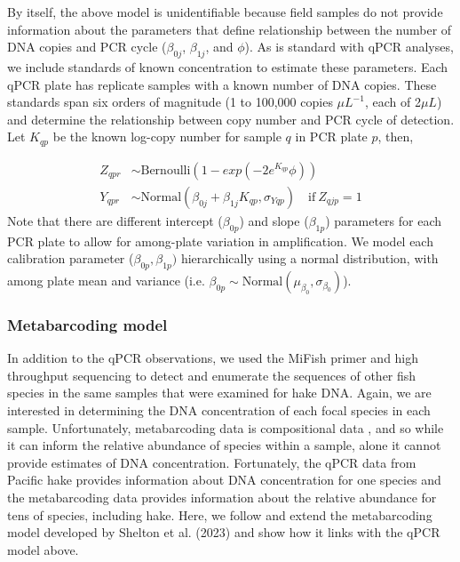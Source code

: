 \documentclass{article}
\begin{document}
By itself, the above model is unidentifiable because field samples do not provide information about the parameters that define relationship between the number of DNA copies and PCR cycle ($\beta_{0j}$, $\beta_{1j}$, and $\phi$). As is standard with qPCR analyses, we include standards of known concentration to estimate these parameters. Each qPCR plate has replicate samples with a known number of DNA copies. These standards span six orders of magnitude (1 to 100,000 copies $\mu L^{-1}$, each of 2$\mu L$) and determine the relationship between copy number and PCR cycle of detection. Let $K_{qp}$ be the known log-copy number for sample $q$ in PCR plate $p$, then,

\begin{align}
  Z_{qpr} &\sim  \mathrm{Bernoulli} \left(1-exp(-2 e^{K_{qp}} \phi) \right)\\
  Y_{qpr} &\sim  \mathrm{Normal} \left(\beta_{0j}+\beta_{1j}{K_{qp}},\sigma_{Yqp}\right) \quad  \mathrm{if} \: Z_{qjp} =1
\end{align}
Note that there are different intercept ($\beta_{0p}$) and slope ($\beta_{1p}$) parameters for each PCR plate to allow for among-plate variation in amplification. We model each calibration parameter ($\beta_{0p},\beta_{1p})$ hierarchically using a normal distribution, with among plate mean and variance (i.e. $\beta_{0p} \sim \mathrm{Normal}(\mu_{\beta_{0}},\sigma_{\beta_{0}})$).

\subsubsection*{Metabarcoding model}

In addition to the qPCR observations, we used the MiFish primer and high throughput sequencing to detect and enumerate the sequences of other fish species in the same samples that were examined for hake DNA. Again, we are interested in determining the DNA concentration of each focal species in each sample. Unfortunately, metabarcoding data is compositional data \cite{shelton2023}, and so while it can inform the relative abundance of species within a sample, alone it cannot provide estimates of DNA concentration. Fortunately, the qPCR data from Pacific hake provides information about DNA concentration for one species and the metabarcoding data provides information about the relative abundance for tens of species, including hake. Here, we follow and extend the metabarcoding model developed by Shelton et al. (2023) and show how it links with the qPCR model above. 
\end{document}
